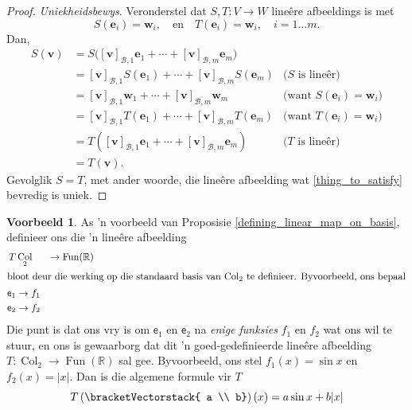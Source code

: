 \documentclass[a4paper,11pt]{book}
\theoremstyle{definition}
\newtheorem{example_environment}{Voorbeeld}[chapter]
\newcommand{\be}{\begin{equation}}
\newcommand{\ee}{\end{equation}}
\newcommand{\ve}[1]{\mathbf{#1}}
\newcommand{\mat}[1]{\mathsf{#1}}
\newcommand{\basis}[1]{{\mathcal #1}}
\newcommand{\cvector}[1]{\bracketVectorstack{#1}}
\newenvironment{example}
	{
		\begin{oframed}
		\begin{example_environment}
	}
	{
		\end{example_environment}
		\end{oframed}
	}
\DeclareMathOperator{\Fun}{Fun}
\DeclareMathOperator{\Col}{Col}
\begin{document}
\begin{proof}
	\noindent \emph{Uniekheidsbewys}. Veronderstel dat $S, T  : V
	\rightarrow W$ line{\^e}re afbeeldings is met
	\be \label{thing_to_satisfy}
		S(\ve{e}_i) = \ve{w}_i, \quad \text{en} \quad T(\ve{e}_i) =
		\ve{w}_i,
		\quad i = 1 \ldots m.
	\ee
	Dan,
	\begin{align*}
		S (\ve{v}) &= S\big([\ve{v}]_{\basis{B}, 1} \ve{e}_1 + \cdots +
		[\ve{v}]_{\basis{B}, m} \ve{e}_m\big) \\
		&= [\ve{v}]_{\basis{B}, 1} S(\ve{e}_1) + \cdots +
		[\ve{v}]_{\basis{B}, m} S(\ve{e}_m) & \mbox{($S$ is line{\^e}r)} \\
		&= [\ve{v}]_{\basis{B}, 1} \ve{w}_1 + \cdots + [\ve{v}]_{\basis{B},
		m} \ve{w}_m & \mbox{(want $S(\ve{e}_i) = \ve{w}_i$)} \\
		&= [\ve{v}]_{\basis{B}, 1} T(\ve{e}_1) + \cdots +
		[\ve{v}]_{\basis{B}, m} T(\ve{e}_m) & \mbox{(want $T(\ve{e}_i) =
		\ve{w}_i$)} \\
		&= T([\ve{v}]_{\basis{B}, 1} \ve{e}_1 +  \cdots +
		[\ve{v}]_{\basis{B}, m} \ve{e}_m) & \mbox{($T$ is line{\^e}r)} \\
		&= T(\ve{v}).  
	\end{align*}
	Gevolglik $S = T$, met ander woorde, die line{\^e}re afbeelding wat
	\eqref{thing_to_satisfy} bevredig is uniek.
\end{proof}

\begin{example} As 'n voorbeeld van Proposisie
	\ref{defining_linear_map_on_basis}, definieer ons die 'n line{\^e}re
	afbeelding
	\begin{align*}
		T & \Col_2 & \rightarrow \Fun(\mathbb{R}) \\
		\intertext{bloot deur die werking op die standaard basis van
		$\Col_2$ te definieer. Byvoorbeeld, ons bepaal}
		\mat{e}_1 & \rightarrow f_1 \\
		\mat{e}_2 & \rightarrow f_2
	\end{align*}
	Die punt is dat ons vry is om $\mat{e}_1$ en $\mat{e}_2$ na \emph{enige
	funksies} $f_1$ en $f_2$ wat ons wil te stuur, en ons is gewaarborg dat
	dit 'n goed-gedefinieerde line{\^e}re afbeelding $T : \Col_2
	\rightarrow \Fun(\mathbb{R})$ sal gee. Byvoorbeeld, ons stel $f_1 (x) =
	\sin x$ en $f_2 (x) = |x|$. Dan is die algemene formule vir $T$
	\[
		T \left( \cvector{ a \\ b} \right) (x) = a \sin x + b |x|
	\]
\end{example}
\end{document}
